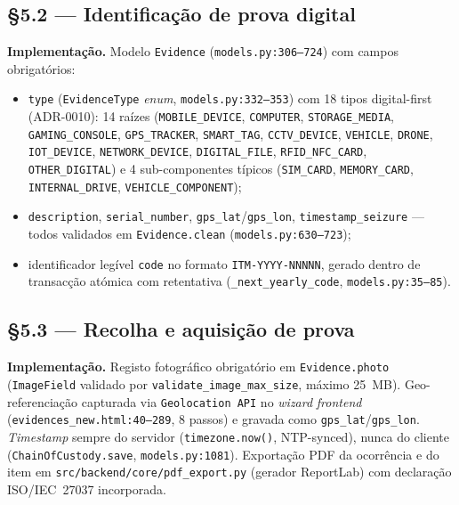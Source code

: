 \documentclass[a4paper,11pt]{article}
\begin{document}
\subsection*{§5.2 --- Identificação de prova digital}

\textbf{Implementação.} Modelo \texttt{Evidence}
(\texttt{models.py:306--724}) com campos obrigatórios:
\begin{itemize}
    \item \texttt{type} (\texttt{EvidenceType} \emph{enum},
          \texttt{models.py:332--353}) com 18 tipos digital-first
          (ADR-0010): 14 raízes (\texttt{MOBILE\_DEVICE},
          \texttt{COMPUTER}, \texttt{STORAGE\_MEDIA},
          \texttt{GAMING\_CONSOLE}, \texttt{GPS\_TRACKER},
          \texttt{SMART\_TAG}, \texttt{CCTV\_DEVICE},
          \texttt{VEHICLE}, \texttt{DRONE}, \texttt{IOT\_DEVICE},
          \texttt{NETWORK\_DEVICE}, \texttt{DIGITAL\_FILE},
          \texttt{RFID\_NFC\_CARD}, \texttt{OTHER\_DIGITAL}) e 4
          sub-componentes típicos (\texttt{SIM\_CARD},
          \texttt{MEMORY\_CARD}, \texttt{INTERNAL\_DRIVE},
          \texttt{VEHICLE\_COMPONENT});
    \item \texttt{description}, \texttt{serial\_number},
          \texttt{gps\_lat}/\texttt{gps\_lon}, \texttt{timestamp\_seizure}
          --- todos validados em \texttt{Evidence.clean}
          (\texttt{models.py:630--723});
    \item identificador legível \texttt{code} no formato
          \texttt{ITM-YYYY-NNNNN}, gerado dentro de transacção atómica com
          retentativa (\texttt{\_next\_yearly\_code},
          \texttt{models.py:35--85}).
\end{itemize}

\subsection*{§5.3 --- Recolha e aquisição de prova}

\textbf{Implementação.} Registo fotográfico obrigatório em
\texttt{Evidence.photo} (\texttt{ImageField} validado por
\texttt{validate\_image\_max\_size}, máximo 25~MB).
Geo-referenciação capturada via \texttt{Geolocation API} no
\emph{wizard} \emph{frontend} (\texttt{evidences\_new.html:40--289}, 8
passos) e gravada como \texttt{gps\_lat}/\texttt{gps\_lon}.
\emph{Timestamp} sempre do servidor (\texttt{timezone.now()}, NTP-synced),
nunca do cliente (\texttt{ChainOfCustody.save}, \texttt{models.py:1081}).
Exportação PDF da ocorrência e do item em
\texttt{src/backend/core/pdf\_export.py} (gerador ReportLab) com
declaração ISO/IEC~27037 incorporada.
\end{document}
